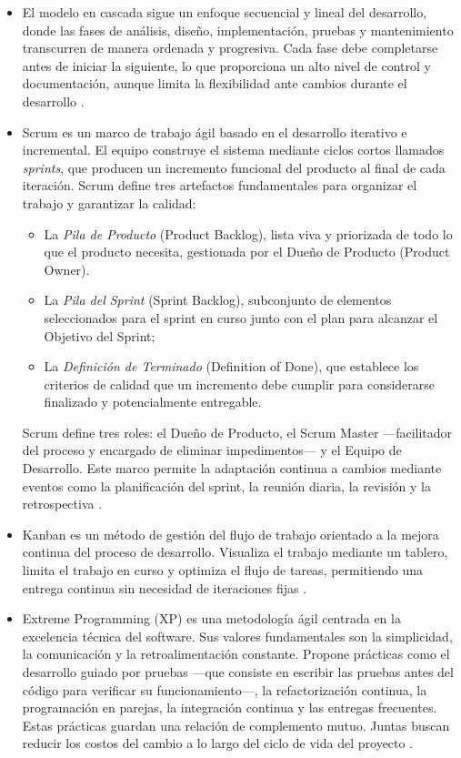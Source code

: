 \begin{itemize}

\item El modelo en cascada sigue un enfoque secuencial y lineal del desarrollo, donde las fases de análisis, diseño, implementación, pruebas y mantenimiento transcurren de manera ordenada y progresiva. Cada fase debe completarse antes de iniciar la siguiente, lo que proporciona un alto nivel de control y documentación, aunque limita la flexibilidad ante cambios durante el desarrollo \cite{Sommerville2015, Royce1987}.

\item Scrum es un marco de trabajo ágil basado en el desarrollo iterativo e incremental. 
El equipo construye el sistema mediante ciclos cortos llamados \textit{sprints}, que producen un incremento funcional del producto al final de cada iteración. 
Scrum define tres artefactos fundamentales para organizar el trabajo y garantizar la calidad: 
\begin{itemize}
    \item La \textit{Pila de Producto} (Product Backlog), lista viva y priorizada de todo lo que el producto necesita, gestionada por el Dueño de Producto (Product Owner).
    \item La \textit{Pila del Sprint} (Sprint Backlog), subconjunto de elementos seleccionados para el sprint en curso junto con el plan para alcanzar el Objetivo del Sprint; 
    \item La \textit{Definición de Terminado} (Definition of Done), que establece los criterios de calidad que un incremento debe cumplir para considerarse finalizado y potencialmente entregable.
\end{itemize}

Scrum define tres roles: el Dueño de Producto, el Scrum Master —facilitador del proceso y encargado de eliminar impedimentos— y el Equipo de Desarrollo. Este marco permite la adaptación continua a cambios mediante eventos como la planificación del sprint, la reunión diaria, la revisión y la retrospectiva \cite{Schwaber2020}.

\item Kanban es un método de gestión del flujo de trabajo orientado a la mejora continua del proceso de desarrollo. Visualiza el trabajo mediante un tablero, limita el trabajo en curso y optimiza el flujo de tareas, permitiendo una entrega continua sin necesidad de iteraciones fijas \cite{Anderson2010}.

\item Extreme Programming (XP) es una metodología ágil centrada en la excelencia técnica del software. Sus valores fundamentales son la simplicidad, la comunicación y la retroalimentación constante. Propone prácticas como el desarrollo guiado por pruebas —que consiste en escribir las pruebas antes del código para verificar su funcionamiento—, la refactorización continua, la programación en parejas, la integración continua y las entregas frecuentes. 
Estas prácticas guardan una relación de complemento mutuo. Juntas buscan reducir los costos del cambio a lo largo del ciclo de vida del proyecto \cite{Beck2004}.

\end{itemize}


